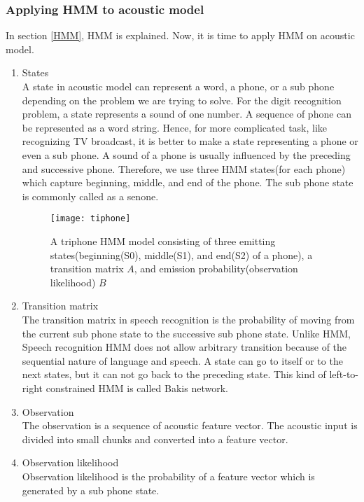 \subsubsection{Applying HMM to acoustic model}
In section \ref{HMM}, HMM is explained. Now, it is time to apply HMM on acoustic model. 
\begin{enumerate}
\item States \\
A state in acoustic model can represent a word, a phone, or a sub phone depending on the problem we are trying to solve. For the digit recognition problem, a state represents a sound of one number. A sequence of phone can be represented as a word string. Hence, for more complicated task, like recognizing TV broadcast, it is better to make a state representing a phone or even a sub phone. A sound of a phone is usually influenced by the preceding and successive phone. Therefore, we use three HMM states(for each phone) which capture beginning, middle, and  end of the phone. The sub phone state is commonly called as a senone.

\begin{figure}[H]
\caption{A triphone HMM model consisting of three emitting states(beginning(S0), middle(S1), and end(S2) of a phone), a transition matrix $A$, and emission probability(observation likelihood) $B$ \cite{SiliconAM}}
\texttt{[image: tiphone]}
\centering
\end{figure}

\item Transition matrix \\
The transition matrix in speech recognition is the probability of moving from the current sub phone state to the successive sub phone state. Unlike HMM, Speech recognition HMM does not allow arbitrary transition because of the sequential nature of language and speech. A state can go to itself or to the next states, but it can not go back to the preceding state. This kind of left-to-right constrained HMM is called Bakis network.

\item Observation \\
The observation is a sequence of acoustic feature vector. The acoustic input is divided into small chunks and converted into a feature vector.

\item Observation likelihood \\
Observation likelihood is the probability of a feature vector which is generated by a sub phone state. 

\end{enumerate}


